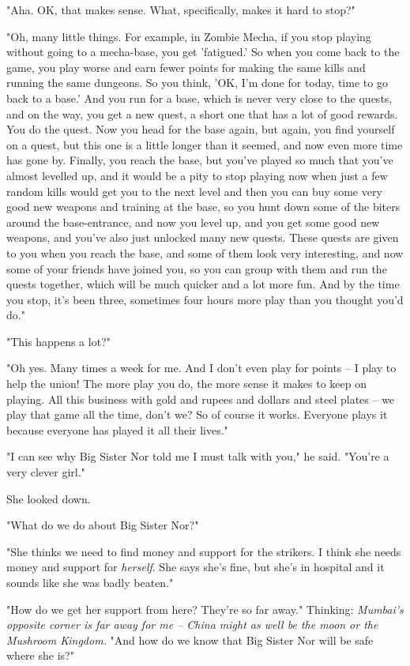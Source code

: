 "Aha. OK, that makes sense. What, specifically, makes it hard to
stop?"

"Oh, many little things. For example, in Zombie Mecha, if you stop
playing without going to a mecha-base, you get 'fatigued.' So when
you come back to the game, you play worse and earn fewer points for
making the same kills and running the same dungeons. So you think,
'OK, I'm done for today, time to go back to a base.' And you run
for a base, which is never very close to the quests, and on the
way, you get a new quest, a short one that has a lot of good
rewards. You do the quest. Now you head for the base again, but
again, you find yourself on a quest, but this one is a little
longer than it seemed, and now even more time has gone by. Finally,
you reach the base, but you've played so much that you've almost
levelled up, and it would be a pity to stop playing now when just a
few random kills would get you to the next level and then you can
buy some very good new weapons and training at the base, so you
hunt down some of the biters around the base-entrance, and now you
level up, and you get some good new weapons, and you've also just
unlocked many new quests. These quests are given to you when you
reach the base, and some of them look very interesting, and now
some of your friends have joined you, so you can group with them
and run the quests together, which will be much quicker and a lot
more fun. And by the time you stop, it's been three, sometimes four
hours more play than you thought you'd do."

"This happens a lot?"

"Oh yes. Many times a week for me. And I don't even play for points
-- I play to help the union! The more play you do, the more sense
it makes to keep on playing. All this business with gold and rupees
and dollars and steel plates -- we play that game all the time,
don't we? So of course it works. Everyone plays it because everyone
has played it all their lives."

"I can see why Big Sister Nor told me I must talk with you," he
said. "You're a very clever girl."

She looked down.

"What do we do about Big Sister Nor?"

"She thinks we need to find money and support for the strikers. I
think she needs money and support for \emph{herself}. She says
she's fine, but she's in hospital and it sounds like she was badly
beaten."

"How do we get her support from here? They're so far away."
Thinking:
\emph{Mumbai's opposite corner is far away for me -- China might as well be the moon or the Mushroom Kingdom.}
"And how do we know that Big Sister Nor will be safe where she
is?"

